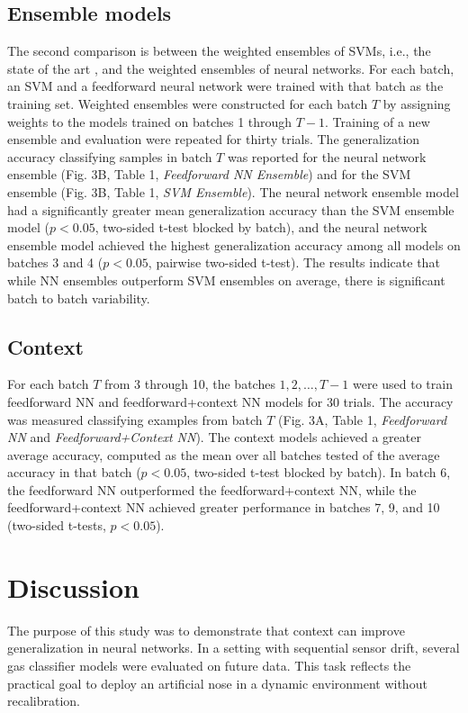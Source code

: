\documentclass[onecolumn,pre,floats,aps,amsmath,amssymb,superscriptaddress]{revtex4-1}
\begin{document}
\subsection{Ensemble models}

The second comparison is between the weighted ensembles of SVMs, i.e., the state of the art \cite{vergara_chemical_2012}, and the weighted ensembles of neural networks. For each batch, an SVM and a feedforward neural network were trained with that batch as the training set. Weighted ensembles were constructed for each batch $T$ by assigning weights to the models trained on batches 1 through $T-1$. Training of a new ensemble and evaluation were repeated for thirty trials. The generalization accuracy classifying samples in batch $T$ was reported for the neural network ensemble (Fig. 3B, Table 1, \textit{Feedforward NN Ensemble}) and for the SVM ensemble (Fig. 3B, Table 1, \textit{SVM Ensemble}). The neural network ensemble model had a significantly greater mean generalization accuracy than the SVM ensemble model ($p < 0.05$, two-sided t-test blocked by batch), and the neural network ensemble model achieved the highest generalization accuracy among all models on batches 3 and 4 ($p < 0.05$, pairwise two-sided t-test). The results indicate that while NN ensembles outperform SVM ensembles on average, there is significant batch to batch variability.

\subsection{Context}
For each batch $T$ from 3 through 10, the batches $1, 2, \ldots, T-1$ were used to train feedforward NN and feedforward+context NN models for 30 trials. The accuracy was measured classifying examples from batch $T$ (Fig. 3A, Table 1, \textit{Feedforward NN} and \textit{Feedforward+Context NN}). The context models achieved a greater average accuracy, computed as the mean over all batches tested of the average accuracy in that batch ($p<0.05$, two-sided t-test blocked by batch). In batch 6, the feedforward NN outperformed the feedforward+context NN, while the feedforward+context NN achieved greater performance in batches 7, 9, and 10 (two-sided t-tests, $p<0.05$).

\section{Discussion}
The purpose of this study was to demonstrate that context can improve generalization in neural networks. In a setting with sequential sensor drift, several gas classifier models were evaluated on future data. This task reflects the practical goal to deploy an artificial nose in a dynamic environment without recalibration.
\end{document}
